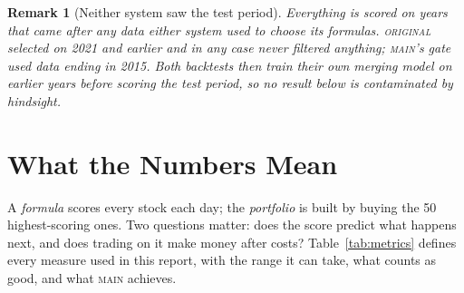 \documentclass[11pt]{article}
\newtheorem{remark}{Remark}
\newcommand{\main}{\textsc{main}}
\newcommand{\orig}{\textsc{original}}
\begin{document}
\begin{remark}[Neither system saw the test period]
Everything is scored on years that came after any data either system used to choose
its formulas. \orig{} selected on 2021 and earlier and in any case never filtered
anything; \main{}'s gate used data ending in 2015. Both backtests then train their own
merging model on earlier years before scoring the test period, so no result below is
contaminated by hindsight.
\end{remark}

\section{What the Numbers Mean}
\label{sec:metrics}

A \emph{formula} scores every stock each day; the \emph{portfolio} is built by buying
the 50 highest-scoring ones. Two questions matter: does the score predict what happens
next, and does trading on it make money after costs? Table~\ref{tab:metrics} defines
every measure used in this report, with the range it can take, what counts as good,
and what \main{} achieves.
\end{document}
